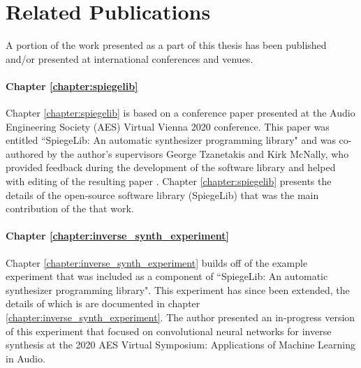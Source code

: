 \newpage
{}

\chapter*{Related Publications}

A portion of the work presented as a part of this thesis has been published and/or presented at international conferences and venues. 

\subsubsection{Chapter \ref{chapter:spiegelib}}
Chapter \ref{chapter:spiegelib} is based on a conference paper presented at the Audio Engineering Society (AES) Virtual Vienna 2020 conference. This paper was entitled ``SpiegeLib: An automatic synthesizer programming library" and was co-authored by the author's supervisors George Tzanetakis and Kirk McNally, who provided feedback during the development of the software library and helped with editing of the resulting paper \cite{shier2020spiegelib}. Chapter \ref{chapter:spiegelib} presents the details of the open-source software library (SpiegeLib) that was the main contribution of the that work. 

\subsubsection{Chapter \ref{chapter:inverse_synth_experiment}}
Chapter \ref{chapter:inverse_synth_experiment} builds off of the example experiment that was included as a component of ``SpiegeLib: An automatic synthesizer programming library". This experiment has since been extended, the details of which is are documented in chapter \ref{chapter:inverse_synth_experiment}. The author presented an in-progress version of this experiment that focused on convolutional neural networks for inverse synthesis at the 2020 AES Virtual Symposium: Applications of Machine Learning in Audio. 

